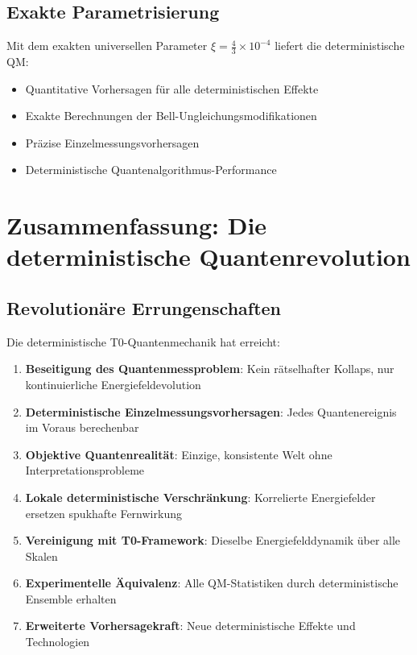 \documentclass[12pt,a4paper]{article}
\newcommand{\xipar}{\xi}
\theoremstyle{definition}
\theoremstyle{remark}
\begin{document}
\subsection{Exakte Parametrisierung}

Mit dem exakten universellen Parameter $\xipar = \frac{4}{3} \times 10^{-4}$ liefert die deterministische QM:

\begin{itemize}
	\item Quantitative Vorhersagen f{\"u}r alle deterministischen Effekte
	\item Exakte Berechnungen der Bell-Ungleichungsmodifikationen
	\item Pr{\"a}zise Einzelmessungsvorhersagen
	\item Deterministische Quantenalgorithmus-Performance
\end{itemize}

\section{Zusammenfassung: Die deterministische Quantenrevolution}

\subsection{Revolution{\"a}re Errungenschaften}

Die deterministische T0-Quantenmechanik hat erreicht:

\begin{enumerate}
	\item \textbf{Beseitigung des Quantenmessproblem}: Kein r{\"a}tselhafter Kollaps, nur kontinuierliche Energiefeldevolution
	\item \textbf{Deterministische Einzelmessungsvorhersagen}: Jedes Quantenereignis im Voraus berechenbar
	\item \textbf{Objektive Quantenrealit{\"a}t}: Einzige, konsistente Welt ohne Interpretationsprobleme
	\item \textbf{Lokale deterministische Verschr{\"a}nkung}: Korrelierte Energiefelder ersetzen spukhafte Fernwirkung
	\item \textbf{Vereinigung mit T0-Framework}: Dieselbe Energiefelddynamik {\"u}ber alle Skalen
	\item \textbf{Experimentelle {\"A}quivalenz}: Alle QM-Statistiken durch deterministische Ensemble erhalten
	\item \textbf{Erweiterte Vorhersagekraft}: Neue deterministische Effekte und Technologien
\end{enumerate}
\end{document}
